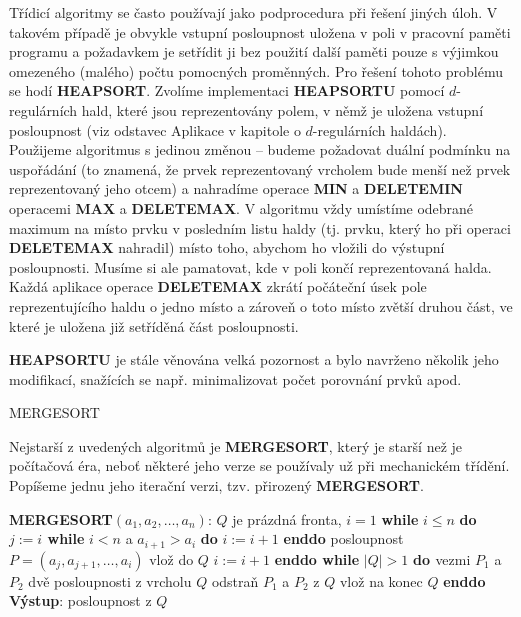 \documentclass[a4paper,12pt]{article}
\begin{document}
Třídicí algoritmy se často používají jako 
podprocedura při řešení jiných úloh. V takovém případě je 
obvykle vstupní posloupnost uložena v poli v pracovní 
paměti programu a poža\-dav\-kem  je setřídit ji 
bez použití další 
paměti pouze s výjimkou omezeného (malého) počtu pomocných 
proměnných. Pro řešení tohoto problému se hodí 
{\bf HEAPSORT}. Zvolíme implementaci {\bf HEAPSORTU} pomocí 
$d$-regulárních hald, které jsou reprezentovány  
polem, v němž je uložena vstupní posloupnost (viz odstavec 
Aplikace v kapitole o $d$-regulárních haldách). Použijeme 
algoritmus s jedinou změnou -- budeme požadovat duální 
podmínku na uspořádání (to znamená, že prvek reprezentovaný 
vrcholem bude menší než prvek reprezentovaný jeho 
otcem) a nahradíme operace {\bf MIN} a {\bf DELETEMIN }
operacemi {\bf MAX} a {\bf DELETEMAX}. V algoritmu vždy umístíme 
odebrané maximum na místo prvku v posled\-ním listu 
haldy (tj. prvku, který ho při operaci {\bf DELETEMAX }
nahradil) místo toho, abychom ho vložili 
do výstupní posloupnosti. Musíme si ale 
pamatovat, kde v poli končí reprezentovaná halda. Každá 
aplikace operace {\bf DELETEMAX} zkrátí počáteční úsek pole 
reprezentujícího haldu o jedno místo 
a zároveň o toto místo zvětší druhou část, ve které je uložena již 
setříděná část posloupnosti. 

{\bf HEAPSORTU} je stále věnována velká pozornost a 
bylo navrže\-no několik jeho modifikací, snažících se 
např. minimalizovat počet porovnání prvků apod.

\head
MERGESORT
\endhead

Nejstarší z uvedených algoritmů je 
{\bf MERGESORT}, který je starší než je počítačová éra, 
neboť některé jeho 
verze se používaly už při mecha\-nickém třídění. Popíšeme 
jednu jeho iterační verzi, tzv. přirozený {\bf MERGESORT}. 

{\bf MERGESORT$(a_1,a_2,\dots,a_n)$}:\newline 
$Q$ je prázdná fronta, $i=1$\newline 
{\bf while} $i\le n$ {\bf do\newline 
\phantom{{\rm ---}}$j:=i$\newline 
\phantom{{\rm ---}}while} $i<n$ a $a_{i+1}>a_i$ {\bf do} $i:=i+1$ {\bf enddo\newline 
\phantom{{\rm ---}}}posloupnost $P=(a_j,a_{j+1},\dots,a_i)$ vlož do $
Q$\newline 
\phantom{---}$i:=i+1$\newline 
{\bf enddo\newline 
while} $|Q|>1$ {\bf do\newline 
\phantom{{\rm ---}}$ $}vezmi $P_1$ a $P_2$ dvě posloupnosti z vrcholu $
Q$\newline 
\phantom{---}odstraň $P_1$ a $P_2$ z $Q$\newline 
\phantom{---}{\bf MERGE$(P_1,P_2)$} vlož na konec $Q$\newline 
{\bf enddo\newline 
Výstup}: posloupnost z $Q$
\end{document}
